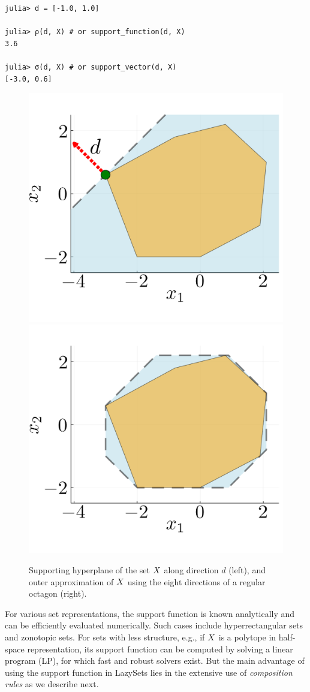 \begin{minipage}{\linewidth}
\vspace{-\abovedisplayskip}
\begin{lstlisting}
julia> d = [-1.0, 1.0]

julia> ρ(d, X) # or support_function(d, X)
3.6

julia> σ(d, X) # or support_vector(d, X)
[-3.0, 0.6]
\end{lstlisting}
\end{minipage}

\begin{figure}
	\centering
	\includegraphics[width=0.49\linewidth, keepaspectratio]{img/supfunc}
	\includegraphics[width=0.49\linewidth, keepaspectratio]{img/supfunc_oct}
	\vspace*{1mm}
	\caption{Supporting hyperplane of the set $X$ along direction $d$ (left), and outer approximation of $X$ using the eight directions of a regular octagon (right).}
	\label{fig:supfunc}
\end{figure}

For various set representations, the support function is known analytically and can be efficiently evaluated numerically. Such cases include hyperrectangular sets and zonotopic sets.
%
For sets with less structure, e.g., if $X$ is a polytope in half-space representation, its support function can be computed by solving a linear program (LP), for which fast and robust solvers exist.
%
But the main advantage of using the support function in LazySets lies in the extensive use of \emph{composition rules} as we describe next.

